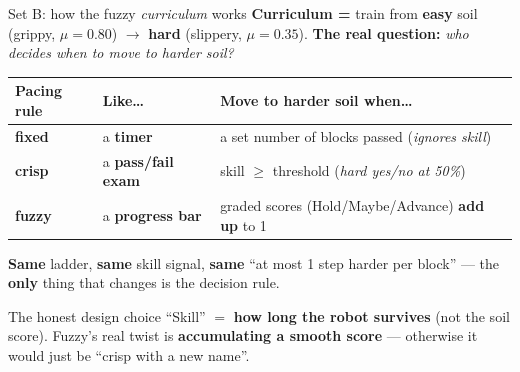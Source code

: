\documentclass[aspectratio=169]{beamer}
\newcommand{\good}[1]{\textcolor{green!55!black}{\textbf{#1}}}
\newcommand{\bad}[1]{\textcolor{red!70!black}{\textbf{#1}}}
\begin{document}
\begin{frame}{Set B: how the fuzzy \textit{curriculum} works}
  \textbf{Curriculum =} train from \good{easy} soil (grippy, $\mu{=}0.80$) $\to$ \bad{hard}
  (slippery, $\mu{=}0.35$). \textbf{The real question:} \textit{who decides when to move to harder soil?}
  \vspace{3pt}
  \begin{center}
  \renewcommand{\arraystretch}{1.35}
  \begin{tabular}{@{}lll@{}}
    \toprule
    \textbf{Pacing rule} & \textbf{Like\ldots} & \textbf{Move to harder soil when\ldots} \\
    \midrule
    \textbf{fixed} & a \textbf{timer}            & a set number of blocks passed \;(\textit{ignores skill}) \\
    \textbf{crisp} & a \textbf{pass/fail exam}   & skill $\ge$ threshold \;(\textit{hard yes/no at 50\%}) \\
    \textbf{fuzzy} & a \textbf{progress bar}     & graded scores (Hold/Maybe/Advance) \textbf{add up} to 1 \\
    \bottomrule
  \end{tabular}
  \end{center}
  \good{Same} ladder, \good{same} skill signal, \good{same} ``at most 1 step harder per block'' --- the
  \textbf{only} thing that changes is the decision rule.
  \begin{block}{The honest design choice}
    ``Skill'' $=$ \textbf{how long the robot survives} (not the soil score). Fuzzy's real twist is
    \textbf{accumulating a smooth score} --- otherwise it would just be ``crisp with a new name''.
  \end{block}
\end{frame}
\end{document}
